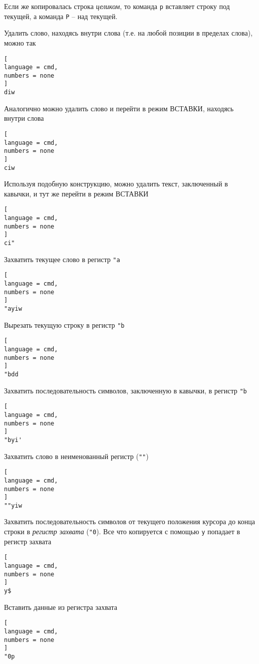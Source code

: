 \documentclass[%
	11pt,
	a4paper,
	utf8,
		]{article}
\begin{document}
Если же копировалась строка \emph{целиком}, то команда \texttt{p} вставляет строку под текущей, а команда \texttt{P} -- над текущей.

Удалить слово, находясь внутри слова (т.е. на любой позиции в пределах слова), можно так
\begin{lstlisting}[
language = cmd,
numbers = none
]
diw
\end{lstlisting}

Аналогично можно удалить слово и перейти в режим ВСТАВКИ, находясь внутри слова
\begin{lstlisting}[
language = cmd,
numbers = none
]
ciw
\end{lstlisting}

Используя подобную конструкцию, можно удалить текст, заключенный в кавычки, и тут же перейти в режим ВСТАВКИ
\begin{lstlisting}[
language = cmd,
numbers = none
]
ci"
\end{lstlisting}

Захватить текущее слово в регистр \texttt{"a}
\begin{lstlisting}[
language = cmd,
numbers = none
]
"ayiw
\end{lstlisting}

Вырезать текущую строку в регистр \texttt{"b}
\begin{lstlisting}[
language = cmd,
numbers = none
]
"bdd
\end{lstlisting}

Захватить последовательность символов, заключенную в кавычки, в регистр \texttt{"b}
\begin{lstlisting}[
language = cmd,
numbers = none
]
"byi'
\end{lstlisting}

Захватить слово в неименованный регистр (\verb|""|)
\begin{lstlisting}[
language = cmd,
numbers = none
]
""yiw
\end{lstlisting}

Захватить последовательность символов от текущего положения курсора до конца строки в \emph{регистр захвата} (\texttt{"0}). Все что копируется с помощью \texttt{y} попадает в регистр захвата
\begin{lstlisting}[
language = cmd,
numbers = none
]
y$
\end{lstlisting}

Вставить данные из регистра захвата
\begin{lstlisting}[
language = cmd,
numbers = none
]
"0p
\end{lstlisting}
\end{document}
